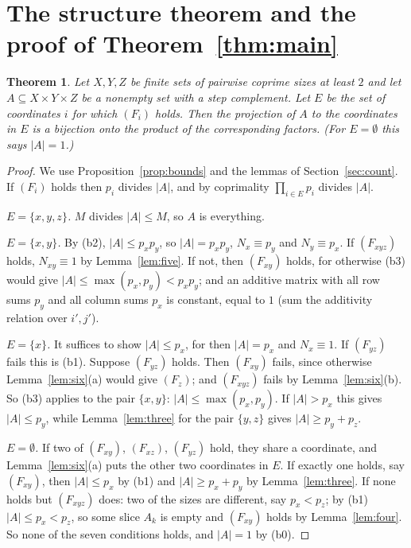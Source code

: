 \documentclass[11pt,a4paper]{amsart}
\newtheorem{theorem}{Theorem}
\theoremstyle{definition}
\theoremstyle{remark}
\begin{document}
\section{The structure theorem and the proof of Theorem~\ref{thm:main}}\label{sec:proof}

\begin{theorem}\label{thm:structure}
Let $X,Y,Z$ be finite sets of pairwise coprime sizes at least $2$ and let $A\subseteq X\times Y\times Z$ be a
nonempty set with a step complement. Let $E$ be the set of coordinates $i$ for which $(F_i)$ holds. Then the
projection of $A$ to the coordinates in $E$ is a bijection onto the product of the corresponding factors. (For
$E=\emptyset$ this says $|A|=1$.)
\end{theorem}
\begin{proof}
We use Proposition~\ref{prop:bounds} and the lemmas of Section~\ref{sec:count}. If $(F_i)$ holds then $p_i$
divides $|A|$, and by coprimality $\prod_{i\in E}p_i$ divides $|A|$.

\emph{$E=\{x,y,z\}$.} $M$ divides $|A|\le M$, so $A$ is everything.

\emph{$E=\{x,y\}$.} By (b2), $|A|\le p_xp_y$, so $|A|=p_xp_y$, $N_x\equiv p_y$ and $N_y\equiv p_x$. If $(F_{xyz})$
holds, $N_{xy}\equiv1$ by Lemma~\ref{lem:five}. If not, then $(F_{xy})$ holds, for otherwise (b3) would give
$|A|\le\max(p_x,p_y)<p_xp_y$; and an additive matrix with all row sums $p_y$ and all column sums $p_x$ is
constant, equal to $1$ (sum the additivity relation over $i',j'$).

\emph{$E=\{x\}$.} It suffices to show $|A|\le p_x$, for then $|A|=p_x$ and $N_x\equiv 1$. If $(F_{yz})$ fails this
is (b1). Suppose $(F_{yz})$ holds. Then $(F_{xy})$ fails, since otherwise Lemma~\ref{lem:six}(a) would give
$(F_z)$; and $(F_{xyz})$ fails by Lemma~\ref{lem:six}(b). So (b3) applies to the pair $\{x,y\}$:
$|A|\le\max(p_x,p_y)$. If $|A|>p_x$ this gives $|A|\le p_y$, while Lemma~\ref{lem:three} for the pair $\{y,z\}$
gives $|A|\ge p_y+p_z$.

\emph{$E=\emptyset$.} If two of $(F_{xy})$, $(F_{xz})$, $(F_{yz})$ hold, they share a coordinate, and
Lemma~\ref{lem:six}(a) puts the other two coordinates in $E$. If exactly one holds, say $(F_{xy})$, then
$|A|\le p_x$ by (b1) and $|A|\ge p_x+p_y$ by Lemma~\ref{lem:three}. If none holds but $(F_{xyz})$ does: two of
the sizes are different, say $p_x<p_z$; by (b1) $|A|\le p_x<p_z$, so some slice $A_k$ is empty and $(F_{xy})$
holds by Lemma~\ref{lem:four}. So none of the seven conditions holds, and $|A|=1$ by (b0).
\end{proof}
\end{document}
